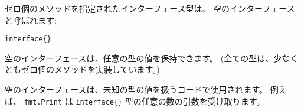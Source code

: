 ゼロ個のメソッドを指定されたインターフェース型は、
空のインターフェース と呼ばれます:

\begin{lstlisting}[numbers=none]
interface{}
\end{lstlisting}

空のインターフェースは、任意の型の値を保持できます。
 (全ての型は、少なくともゼロ個のメソッドを実装しています。)

空のインターフェースは、未知の型の値を扱うコードで使用されます。
例えば、 \texttt{fmt.Print} は \texttt{interface\{\}} 型の任意の数の引数を受け取ります。